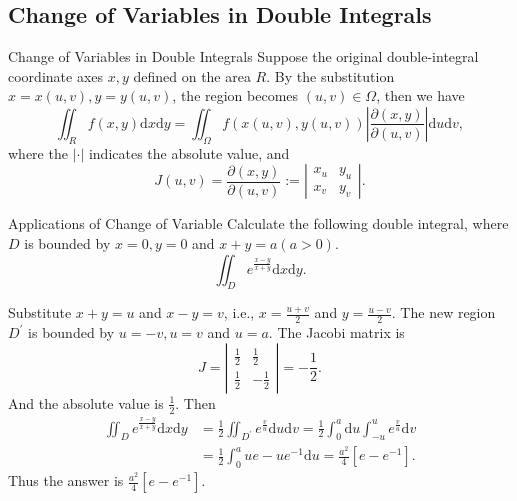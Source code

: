 \subsection{Change of Variables in Double Integrals}

\begin{proposition}{Change of Variables in Double Integrals}{}
  Suppose the original double-integral coordinate axes $x, y$ defined on the
  area $R$.
  By the substitution $x = x(u, v), y = y(u, v)$, the region becomes $(u, v) \in
  \Omega$, then we have
  \begin{equation}
    \iint_Rf(x,y)\mathrm{d}x\mathrm{d}y=\iint_\Omega f(x(u,v),y(u,v))\left|\frac{\partial(x,y)}{\partial(u,v)}\right|\mathrm{d}u\mathrm{d}v,
  \end{equation}
  where the $|\cdot|$ indicates the absolute value, and
  \begin{equation}
    J(u,v) = \frac{\partial (x, y)}{\partial (u, v)} := \left|
      \begin{array}{cc}
        x_u&y_u\\
        x_v&y_v
      \end{array}
    \right|.
  \end{equation}
\end{proposition}

\begin{example}{Applications of Change of Variable}{}
  Calculate the following double integral, where $D$ is bounded by $x = 0, y =
  0$ and $x+y = a (a > 0)$.
  \begin{equation}
    \iint_D e^{\frac{x-y}{x+y}}\mathrm{d} x \mathrm{d} y.
  \end{equation}
\end{example}

\begin{solution}
  Substitute $x+y = u$ and $x-y = v$, i.e., $x = \frac{u+v}{2}$ and $y = \frac{u-v}{2}$.
  The new region $D^{\prime}$ is bounded by $u = -v, u = v$ and $u = a$.
  The Jacobi matrix is 
  \begin{equation}
    J = \left|
      \begin{array}{cc}
        \frac{1}{2}&\frac{1}{2}\\
        \frac{1}{2}&-\frac{1}{2}
      \end{array}
    \right| = - \frac{1}{2}.
  \end{equation}
  And the absolute value is $\frac{1}{2}$.
  Then
  \begin{align}
    \iint_D e^{\frac{x-y}{x+y}}\mathrm{d} x \mathrm{d} y
    &= \frac{1}{2}\iint_{D^{\prime}} e^{\frac{v}{u}}\mathrm{d}u\mathrm{d}v
    = \frac{1}{2} \int_0^a \mathrm{d} u \int_{-u}^u e^{\frac{v}{u}}\mathrm{d} v\\
    &= \frac{1}{2} \int_0^a ue - ue^{-1}\mathrm{d} u
    = \frac{a^2}{4}[e - e^{-1}].
  \end{align}
  Thus the answer is $\frac{a^2}{4} [e - e^{-1}]$.
\end{solution}

